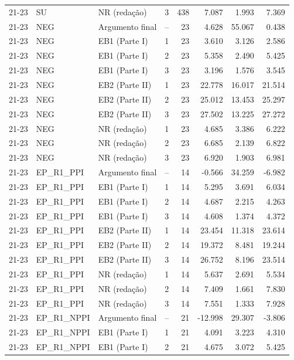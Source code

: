 \begin{longtable}{lllcrrrr}
21-23 & SU & NR (redação) & 3 & 438 & 7.087 & 1.993 & 7.369 \\
21-23 & NEG & Argumento final & -- & 23 & 4.628 & 55.067 & 0.438 \\
21-23 & NEG & EB1 (Parte I) & 1 & 23 & 3.610 & 3.126 & 2.586 \\
21-23 & NEG & EB1 (Parte I) & 2 & 23 & 5.358 & 2.490 & 5.425 \\
21-23 & NEG & EB1 (Parte I) & 3 & 23 & 3.196 & 1.576 & 3.545 \\
21-23 & NEG & EB2 (Parte II) & 1 & 23 & 22.778 & 16.017 & 21.514 \\
21-23 & NEG & EB2 (Parte II) & 2 & 23 & 25.012 & 13.453 & 25.297 \\
21-23 & NEG & EB2 (Parte II) & 3 & 23 & 27.502 & 13.225 & 27.272 \\
21-23 & NEG & NR (redação) & 1 & 23 & 4.685 & 3.386 & 6.222 \\
21-23 & NEG & NR (redação) & 2 & 23 & 6.685 & 2.139 & 6.822 \\
21-23 & NEG & NR (redação) & 3 & 23 & 6.920 & 1.903 & 6.981 \\
21-23 & EP\_R1\_PPI & Argumento final & -- & 14 & -0.566 & 34.259 & -6.982 \\
21-23 & EP\_R1\_PPI & EB1 (Parte I) & 1 & 14 & 5.295 & 3.691 & 6.034 \\
21-23 & EP\_R1\_PPI & EB1 (Parte I) & 2 & 14 & 4.687 & 2.215 & 4.263 \\
21-23 & EP\_R1\_PPI & EB1 (Parte I) & 3 & 14 & 4.608 & 1.374 & 4.372 \\
21-23 & EP\_R1\_PPI & EB2 (Parte II) & 1 & 14 & 23.454 & 11.318 & 23.614 \\
21-23 & EP\_R1\_PPI & EB2 (Parte II) & 2 & 14 & 19.372 & 8.481 & 19.244 \\
21-23 & EP\_R1\_PPI & EB2 (Parte II) & 3 & 14 & 26.752 & 8.196 & 23.514 \\
21-23 & EP\_R1\_PPI & NR (redação) & 1 & 14 & 5.637 & 2.691 & 5.534 \\
21-23 & EP\_R1\_PPI & NR (redação) & 2 & 14 & 7.409 & 1.661 & 7.830 \\
21-23 & EP\_R1\_PPI & NR (redação) & 3 & 14 & 7.551 & 1.333 & 7.928 \\
21-23 & EP\_R1\_NPPI & Argumento final & -- & 21 & -12.998 & 29.307 & -3.806 \\
21-23 & EP\_R1\_NPPI & EB1 (Parte I) & 1 & 21 & 4.091 & 3.223 & 4.310 \\
21-23 & EP\_R1\_NPPI & EB1 (Parte I) & 2 & 21 & 4.675 & 3.072 & 5.425 \\

\end{longtable}
